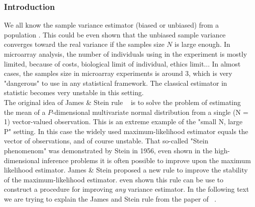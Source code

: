 \subsubsection{Introduction}
We all know the sample variance estimator (biased or unbiased) from a population . This could be even shown that the unbiased sample variance converges toward the real variance if the samples size $N$ is large enough. In microarray analysis, the number of individuals using in the experiment is mostly limited, because of costs, biological limit of individual, ethics limit... In almost cases, the samples size in microarray experiments is around 3, which is very "dangerous" to use in any statistical framework. The classical estimator in statistic becomes very unstable in this setting.\\
The original idea of James \& Stein rule ~\citep{Stein:1955p2498} is to solve the problem of estimating the mean of a $P$-dimensional multivariate normal distribution from a single (N = 1) vector-valued observation. This is an extreme example of the "small N, large P" setting. In this case the widely used maximum-likelihood estimator equals the vector of observations, and of course unstable. That so-called "Stein phenomenom" was demonstrated by Stein in 1956, even shown in the high-dimensional inference problems it is often possible to improve upon the maximum likelihood estimator. James \& Stein proposed a new rule to improve the stability of the maximum-likelihood estimator. \cite{OpgenRhein:2007p11} even shown this rule can be use to construct a procedure for improving {\it any} variance estimator. In the following text we are trying to explain the James and Stein rule from the paper of ~\cite{OpgenRhein:2007p11}.\\
